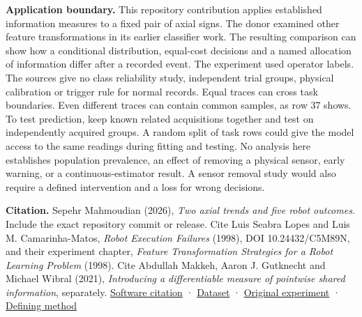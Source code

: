 \textbf{Application boundary.} This repository contribution applies established information measures to a fixed pair of axial signs. The donor examined other feature transformations in its earlier classifier work. The resulting comparison can show how a conditional distribution, equal-cost decisions and a named allocation of information differ after a recorded event. The experiment used operator labels. The sources give no class reliability study, independent trial groups, physical calibration or trigger rule for normal records. Equal traces can cross task boundaries. Even different traces can contain common samples, as row 37 shows. To test prediction, keep known related acquisitions together and test on independently acquired groups. A random split of task rows could give the model access to the same readings during fitting and testing. No analysis here establishes population prevalence, an effect of removing a physical sensor, early warning, or a continuous-estimator result. A sensor removal study would also require a defined intervention and a loss for wrong decisions.

\textbf{Citation.} Sepehr Mahmoudian (2026), \emph{Two axial trends and five robot outcomes}. Include the exact repository commit or release. Cite Luis Seabra Lopes and Luis M. Camarinha-Matos, \emph{Robot Execution Failures} (1998), DOI 10.24432/C5M89N, and their experiment chapter, \emph{Feature Transformation Strategies for a Robot Learning Problem} (1998). Cite Abdullah Makkeh, Aaron J. Gutknecht and Michael Wibral (2021), \emph{Introducing a differentiable measure of pointwise shared information}, separately. \href{https://github.com/sepahead/pid-rs/blob/main/CITATION.cff}{Software citation} · \href{https://doi.org/10.24432/C5M89N}{Dataset} · \href{https://doi.org/10.1007/978-1-4615-5725-8_23}{Original experiment} · \href{https://doi.org/10.1103/PhysRevE.103.032149}{Defining method}
